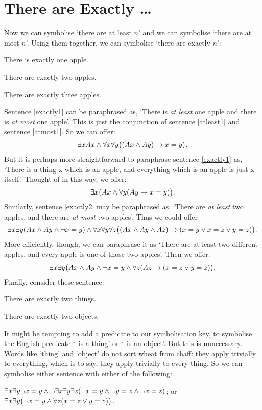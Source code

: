 \section{There are Exactly …}
Now we can symbolise `there are at least $n$' and we can symbolise `there are at most $n$'. Using them together, we can symbolise `there are exactly $n$':
\begin{earg}
\item[\ex{exactly1}] There is exactly one apple.
\item[\ex{exactly2}] There are exactly two apples.
\item[\ex{exactly3}] There are exactly three apples.
\end{earg}
Sentence \ref{exactly1} can be paraphrased as, `There is \emph{at least} one apple and there is \emph{at most} one apple'. This is just the conjunction of sentence \ref{atleast1} and sentence \ref{atmost1}. So we can offer:
$$\exists x Ax \wedge \forall x\forall y\bigl( (Ax \wedge Ay) \rightarrow x=y\bigr).$$
But it is perhaps more straightforward to paraphrase sentence \ref{exactly1} as, `There is a thing x which is an apple, and everything which is an apple is just x itself'. Thought of in this way, we offer: 
$$\exists x\bigl(Ax \wedge \forall y(Ay \rightarrow x= y) \bigr).$$
Similarly, sentence \ref{exactly2} may be paraphrased as, `There are \emph{at least} two apples, and there are \emph{at most} two apples'. Thus we could offer 
$$\exists x \exists y(Ax \wedge Ay \wedge \neg x = y) \wedge \forall x\forall y\forall z\bigl( (Ax \wedge Ay \wedge Az) \rightarrow (x=y \vee x=z \vee y=z) \bigr).$$
More efficiently, though, we can paraphrase it as `There are at least two different apples, and every apple is one of those two apples'. Then we offer:
$$\exists x\exists y\bigl(Ax \wedge Ay \wedge \neg x = y \wedge \forall z(Az \rightarrow ( x= z \vee y = z) \bigr).$$
Finally, consider these sentence:
\begin{earg}
\item[\ex{exactly2things}] There are exactly two things.
\item[\ex{exactly2objects}] There are exactly two objects.
\end{earg}
It might be tempting to add a predicate to our symbolisation key, to symbolise the English predicate `\blank\ is a thing' or `\blank\ is an object'. But this is unnecessary. Words like `thing' and `object' do not sort wheat from chaff: they apply trivially to everything, which is to say, they apply trivially to every thing. So we can symbolise either sentence with either of the following:
	\begin{center}
		$\exists x \exists y \neg x = y \wedge \neg \exists x \exists y \exists z (\neg x = y \wedge \neg y = z \wedge \neg x = z)$; or\\
		$\exists x \exists y \bigl(\neg x = y \wedge \forall z(x=z \vee y = z) \bigr)$.
	\end{center}

